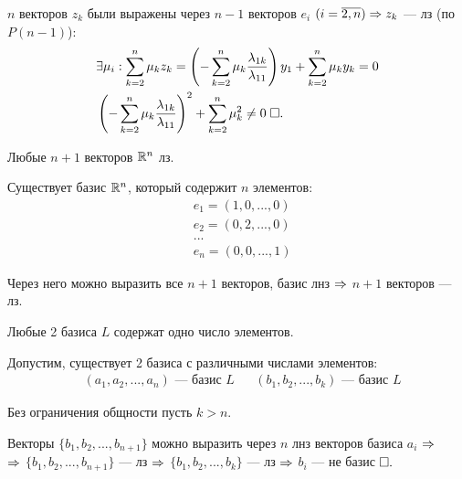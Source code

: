 \documentclass{article}
\begin{document}
\begin{enumerate}
\begin{enumerate}
		$n$ векторов $z_{k}$ были выражены через $n-1$ векторов $e_{i}$ $(i=\overline{2,n})\Rarr z_{k}$ --- лз (по $P(n-1)$):
		\begin{align*}
			 & \exists\mu_{i}:\sum_{k=2}^{n}\mu_{k}z_{k}=\left(-\sum_{k=2}^{n}\mu_{k}\frac{\lambda_{1k}}{\lambda_{11}}\right)y_1+\sum_{k=2}^{n}\mu_{k}y_{k}=0 \\
			 & \left(-\sum_{k=2}^{n}\mu_{k}\frac{\lambda_{1k}}{\lambda_{11}}\right)^{2}+\sum_{k=2}^{n}\mu_{k}^{2}\neq 0\qed
		\end{align*}
	\end{enumerate}
\end{enumerate}

\pagebreak

\result[1]

Любые $n+1$ векторов $\R^{n}$ лз.

\proof

Существует базис $\R^{n}$, который содержит $n$ элементов:
\begin{align*}
	 & e_1=(1,0,...,0)   \\
	 & e_2=(0,2,...,0)   \\
	 & ...               \\
	 & e_{n}=(0,0,...,1)
\end{align*}

Через него можно выразить все $n+1$ векторов, базис лнз $\Rarr$ $n+1$ векторов --- лз.

\result[2]

Любые 2 базиса $L$ содержат одно число элементов.

\proof

Допустим, существует 2 базиса с различными числами элементов:
\begin{align*}
	 & (a_1,a_2,...,a_{n})\text{ --- базис $L$} &  & (b_1,b_2,...,b_{k})\text{ --- базис $L$}
\end{align*}

Без ограничения общности пусть $k>n$.

Векторы $\{b_1,b_2,...,b_{n+1}\}$ можно выразить через $n$ лнз векторов базиса $a_{i}$ $\Rarr$\\
$\Rarr$ $\{b_1,b_2,...,b_{n+1}\}$ --- лз $\Rarr$ $\{b_1,b_2,...,b_{k}\}$ --- лз $\Rarr$ $b_{i}$ --- не базис$\qed$
\end{document}
